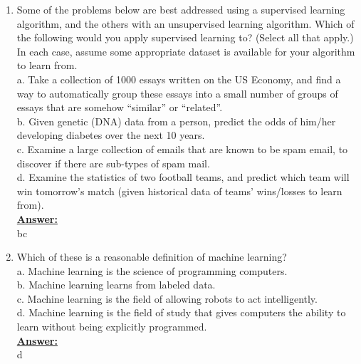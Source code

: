 \documentclass{article}
\newenvironment{qparts}{\begin{enumerate}[1.]}{\end{enumerate}}
\begin{document}
\begin{qparts}
 \underline{\textbf{Answer:}}\\
cd


 \item Some of the problems below are best addressed using a supervised learning algorithm, and the others with an unsupervised learning algorithm. Which of the following would you apply supervised learning to? (Select all that apply.) In each case, assume some appropriate dataset is available for your algorithm to learn from.\\
a. Take a collection of 1000 essays written on the US Economy, and find a way to automatically group these essays into a small number of groups of essays that are somehow “similar” or “related”.\\
b. Given genetic (DNA) data from a person, predict the odds of him/her developing diabetes over the next 10 years.\\
c. Examine a large collection of emails that are known to be spam email, to discover if there are sub-types of spam mail.\\
d. Examine the statistics of two football teams, and predict which team will win tomorrow’s match (given historical data of teams’ wins/losses to learn from).\\
 
 \underline{\textbf{Answer:}}\\
bc


 \item Which of these is a reasonable definition of machine learning?\\
a. Machine learning is the science of programming computers.\\
b. Machine learning learns from labeled data.\\
c. Machine learning is the field of allowing robots to act intelligently.\\
d. Machine learning is the field of study that gives computers the ability to learn without being explicitly programmed.\\
 
 \underline{\textbf{Answer:}}\\
d

\end{qparts}

\newpage
\end{document}

